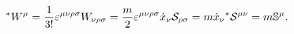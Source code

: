 \begin{equation}
^{\ast }W^{\mu }=\frac{1}{3!}\varepsilon ^{\mu \nu \rho \sigma }W_{\nu \rho
\sigma }=\frac{m}{2}\varepsilon ^{\mu \nu \rho \sigma }\dot{x}_{\nu }%
\mathcal{S}_{\rho \sigma }=m\dot{x}_{\nu }{}^{*}\mathcal{S}^{\mu \nu }=m\Bbb{%
S}^{\mu }.  \label{Pauli}
\end{equation}

